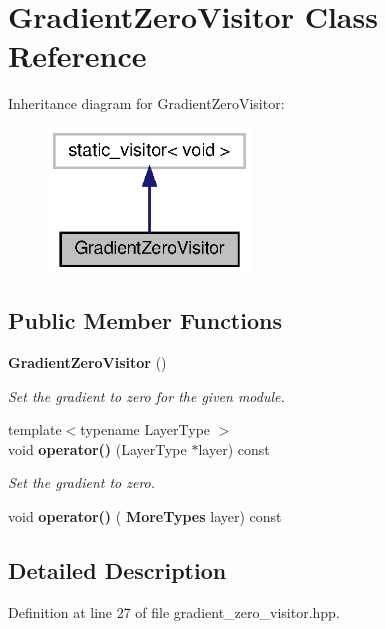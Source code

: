 \section{Gradient\+Zero\+Visitor Class Reference}
\label{classmlpack_1_1ann_1_1GradientZeroVisitor}


Inheritance diagram for Gradient\+Zero\+Visitor\+:
\nopagebreak
\begin{figure}[H]
\begin{center}
\leavevmode
\includegraphics[width=152pt]{classmlpack_1_1ann_1_1GradientZeroVisitor__inherit__graph}
\end{center}
\end{figure}
\subsection*{Public Member Functions}
\begin{DoxyCompactItemize}
\item 
\textbf{ Gradient\+Zero\+Visitor} ()
\begin{DoxyCompactList}\small\item\em Set the gradient to zero for the given module. \end{DoxyCompactList}\item 
{\footnotesize template$<$typename Layer\+Type $>$ }\\void \textbf{ operator()} (Layer\+Type $\ast$layer) const
\begin{DoxyCompactList}\small\item\em Set the gradient to zero. \end{DoxyCompactList}\item 
void \textbf{ operator()} (\textbf{ More\+Types} layer) const
\end{DoxyCompactItemize}


\subsection{Detailed Description}


Definition at line 27 of file gradient\+\_\+zero\+\_\+visitor.\+hpp.



